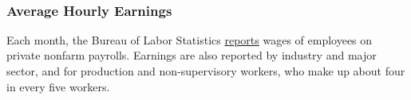 \begin{minipage}{0.40\textwidth}
\\
\end{minipage} \hspace{5mm} \begin{minipage}{0.32\textwidth}
\small 
\end{minipage}
\newpage

\subsubsection*{Average Hourly Earnings}
\begin{minipage}{0.76\textwidth}    
\small Each month, the Bureau of Labor Statistics \href{https://www.bls.gov/news.release/empsit.nr0.htm}{reports} wages of employees on private nonfarm payrolls. Earnings are also reported by industry and major sector, and for production and non-supervisory workers, who make up about four in every five workers. 
\end{minipage}
\vspace{1mm}

